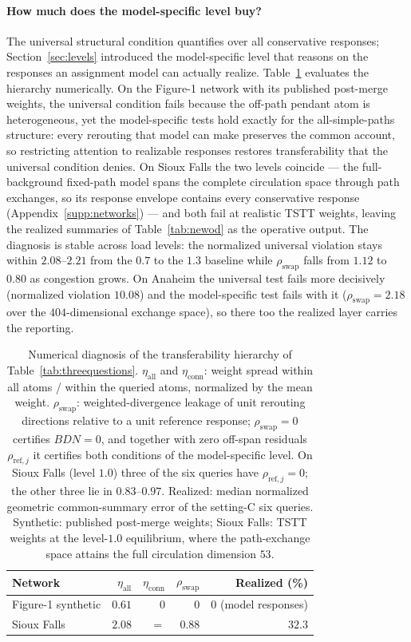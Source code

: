 \paragraph{How much does the model-specific level buy?}\label{sec:levelsdiag}
The universal structural condition quantifies over all conservative
responses; Section~\ref{sec:levels} introduced the model-specific level
that reasons on the responses an assignment model can actually realize.
Table~\ref{tab:levelsdiag} evaluates the hierarchy numerically. On the
Figure-1 network with its published post-merge weights, the universal
condition fails because the off-path pendant atom is heterogeneous, yet
the model-specific tests hold exactly for the all-simple-paths
structure: every rerouting that model can make preserves the common
account, so restricting attention to realizable responses restores
transferability that the universal condition denies. On Sioux Falls the
two levels coincide --- the full-background fixed-path model spans the
complete circulation space through path exchanges, so its response
envelope contains every conservative response
(Appendix~\ref{supp:networks}) --- and both fail at realistic TSTT
weights, leaving the realized summaries of Table~\ref{tab:newod} as the
operative output. The diagnosis is stable across load levels: the
normalized universal violation stays within $2.08$--$2.21$ from the
$0.7$ to the $1.3$ baseline while $\rho_{\mathrm{swap}}$ falls from
$1.12$ to $0.80$ as congestion grows. On Anaheim the universal test
fails more decisively (normalized violation $10.08$) and the
model-specific test fails with it ($\rho_{\mathrm{swap}}=2.18$ over the
$404$-dimensional exchange space), so there too the realized layer
carries the reporting.
\begin{table}[t]\centering\footnotesize
\caption{Numerical diagnosis of the transferability hierarchy of
Table~\ref{tab:threequestions}. $\eta_{\mathrm{all}}$ and
$\eta_{\mathrm{conn}}$: weight spread within all atoms / within the
queried atoms, normalized by the mean weight. $\rho_{\mathrm{swap}}$:
weighted-divergence leakage of unit rerouting directions relative to a
unit reference response; $\rho_{\mathrm{swap}}=0$ certifies
$BDN=0$, and together with zero off-span residuals
$\rho_{\mathrm{ref},j}$ it certifies both conditions of the
model-specific level. On Sioux Falls (level $1.0$) three of the six
queries have $\rho_{\mathrm{ref},j}=0$; the other three lie in
$0.83$--$0.97$. Realized: median
normalized geometric common-summary error of the setting-C six
queries. Synthetic: published post-merge weights; Sioux Falls: TSTT
weights at the level-$1.0$ equilibrium, where the path-exchange space
attains the full circulation dimension $53$.}\label{tab:levelsdiag}
\begin{tabular}{lrrrr}\toprule
Network & $\eta_{\mathrm{all}}$ & $\eta_{\mathrm{conn}}$ & $\rho_{\mathrm{swap}}$ & Realized (\%)\\\midrule
Figure-1 synthetic & $0.61$ & $0$ & $0$ & $0$ (model responses)\\
Sioux Falls & $2.08$ & $=$ & $0.88$ & $32.3$\\
\bottomrule\end{tabular}\end{table}

